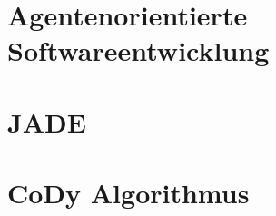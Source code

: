 \section{Agentenorientierte Softwareentwicklung}
\label{chap:aose}

%
\section{JADE}
\label{chap:jade}

%
\section{CoDy Algorithmus}
\label{chap:cody}
